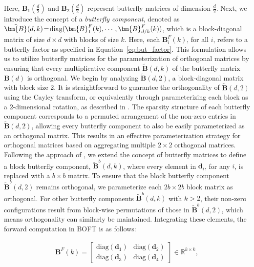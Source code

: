Here, $\bm{B}_1(\frac{d}{2})$ and $\bm{B}_2(\frac{d}{2})$ represent butterfly matrices of dimension $\frac{d}{2}$. Next, we introduce the concept of a \emph{butterfly component}, denoted as $\thickmuskip=2mu \medmuskip=2mu \tilde{\bm{B}}(d,k)=\text{diag}(\bm{B}^F_1(k),\cdots,\bm{B}^F_{d/k}(k))$, which is a block-diagonal matrix of size $d \times d$ with blocks of size $k$. Here, each $\bm{B}^F_i(k)$, for all $i$, refers to a butterfly factor as specified in Equation~\ref{eq:but_factor}. This formulation allows us to utilize butterfly matrices for the parameterization of orthogonal matrices by ensuring that every multiplicative component $\tilde{\bm{B}}(d,k)$ of the butterfly matrix $\bm{B}(d)$ is orthogonal. We begin by analyzing $\tilde{\bm{B}}(d,2)$, a block-diagonal matrix with block size 2. It is straightforward to guarantee the orthogonality of $\tilde{\bm{B}}(d,2)$ using the Cayley transform, or equivalently through parameterizing each block as a $2$-dimensional rotation, as described in \cite{liu2021orthogonal,qiu2023controlling}. The sparsity structure of each butterfly component corresponds to a permuted arrangement of the non-zero entries in $\tilde{\bm{B}}(d,2)$, allowing every butterfly component to also be easily parameterized as an orthogonal matrix. This results in an effective parameterization strategy for orthogonal matrices based on aggregating multiple $2 \times 2$ orthogonal matrices. Following the approach of \cite{chen2022pixelated}, we extend the concept of butterfly matrices to define a block butterfly component, $\tilde{\bm{B}}^b(d,k)$, where every element in $\bm{d}_i$, for any $i$, is replaced with a $b \times b$ matrix. To ensure that the block butterfly component $\tilde{\bm{B}}^b(d,2)$ remains orthogonal, we parameterize each $2b \times 2b$ block matrix as orthogonal. For other butterfly components $\tilde{\bm{B}}^b(d,k)$ with $k>2$, their non-zero configurations result from block-wise permutations of those in $\tilde{\bm{B}}^b(d,2)$, which means orthogonality can similarly be maintained. Integrating these elements, the forward computation in BOFT is as follows:

\begin{equation}\label{eq:but_factor}
\begin{aligned}
    \bm{B}^F(k)=\begin{bmatrix}
    \text{diag}(\bm{d}_1) & \text{diag}(\bm{d}_2) \\
    \text{diag}(\bm{d}_3) & \text{diag}(\bm{d}_4)
    \end{bmatrix}\in\mathbb{R}^{k\times k},
\end{aligned}
\end{equation}



